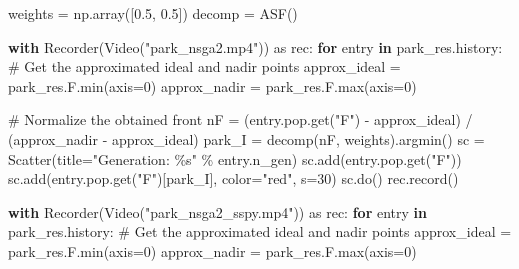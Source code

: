 \documentclass[
  letterpaper,
  DIV=11,
  numbers=noendperiod]{scrartcl}
\newenvironment{Shaded}{\begin{snugshade}}{\end{snugshade}}
\newcommand{\BuiltInTok}[1]{\textcolor[rgb]{0.00,0.23,0.31}{#1}}
\newcommand{\CommentTok}[1]{\textcolor[rgb]{0.37,0.37,0.37}{#1}}
\newcommand{\ControlFlowTok}[1]{\textcolor[rgb]{0.00,0.23,0.31}{\textbf{#1}}}
\newcommand{\DecValTok}[1]{\textcolor[rgb]{0.68,0.00,0.00}{#1}}
\newcommand{\FloatTok}[1]{\textcolor[rgb]{0.68,0.00,0.00}{#1}}
\newcommand{\ImportTok}[1]{\textcolor[rgb]{0.00,0.46,0.62}{#1}}
\newcommand{\KeywordTok}[1]{\textcolor[rgb]{0.00,0.23,0.31}{\textbf{#1}}}
\newcommand{\NormalTok}[1]{\textcolor[rgb]{0.00,0.23,0.31}{#1}}
\newcommand{\OperatorTok}[1]{\textcolor[rgb]{0.37,0.37,0.37}{#1}}
\newcommand{\SpecialCharTok}[1]{\textcolor[rgb]{0.37,0.37,0.37}{#1}}
\newcommand{\StringTok}[1]{\textcolor[rgb]{0.13,0.47,0.30}{#1}}
\begin{document}
\begin{Shaded}
\begin{Highlighting}[]
\NormalTok{weights }\OperatorTok{=}\NormalTok{ np.array([}\FloatTok{0.5}\NormalTok{, }\FloatTok{0.5}\NormalTok{])}
\NormalTok{decomp }\OperatorTok{=}\NormalTok{ ASF()}

\ControlFlowTok{with}\NormalTok{ Recorder(Video(}\StringTok{"park\_nsga2.mp4"}\NormalTok{)) }\ImportTok{as}\NormalTok{ rec:}
    \ControlFlowTok{for}\NormalTok{ entry }\KeywordTok{in}\NormalTok{ park\_res.history:}
        \CommentTok{\# Get the approximated ideal and nadir points}
\NormalTok{        approx\_ideal }\OperatorTok{=}\NormalTok{ park\_res.F.}\BuiltInTok{min}\NormalTok{(axis}\OperatorTok{=}\DecValTok{0}\NormalTok{)}
\NormalTok{        approx\_nadir }\OperatorTok{=}\NormalTok{ park\_res.F.}\BuiltInTok{max}\NormalTok{(axis}\OperatorTok{=}\DecValTok{0}\NormalTok{)}

        \CommentTok{\# Normalize the obtained front}
\NormalTok{        nF }\OperatorTok{=}\NormalTok{ (entry.pop.get(}\StringTok{"F"}\NormalTok{) }\OperatorTok{{-}}\NormalTok{ approx\_ideal) }\OperatorTok{/}\NormalTok{ (approx\_nadir }\OperatorTok{{-}}\NormalTok{ approx\_ideal)}
\NormalTok{        park\_I }\OperatorTok{=}\NormalTok{ decomp(nF, weights).argmin()}
\NormalTok{        sc }\OperatorTok{=}\NormalTok{ Scatter(title}\OperatorTok{=}\StringTok{"Generation: }\SpecialCharTok{\%s}\StringTok{"} \OperatorTok{\%}\NormalTok{ entry.n\_gen)}
\NormalTok{        sc.add(entry.pop.get(}\StringTok{"F"}\NormalTok{))}
\NormalTok{        sc.add(entry.pop.get(}\StringTok{"F"}\NormalTok{)[park\_I], color}\OperatorTok{=}\StringTok{"red"}\NormalTok{, s}\OperatorTok{=}\DecValTok{30}\NormalTok{)}
\NormalTok{        sc.do()}
\NormalTok{        rec.record()}


\ControlFlowTok{with}\NormalTok{ Recorder(Video(}\StringTok{"park\_nsga2\_sspy.mp4"}\NormalTok{)) }\ImportTok{as}\NormalTok{ rec:}
    \ControlFlowTok{for}\NormalTok{ entry }\KeywordTok{in}\NormalTok{ park\_res.history:}
        \CommentTok{\# Get the approximated ideal and nadir points}
\NormalTok{        approx\_ideal }\OperatorTok{=}\NormalTok{ park\_res.F.}\BuiltInTok{min}\NormalTok{(axis}\OperatorTok{=}\DecValTok{0}\NormalTok{)}
\NormalTok{        approx\_nadir }\OperatorTok{=}\NormalTok{ park\_res.F.}\BuiltInTok{max}\NormalTok{(axis}\OperatorTok{=}\DecValTok{0}\NormalTok{)}


\end{Highlighting}
\end{Shaded}
\end{document}

